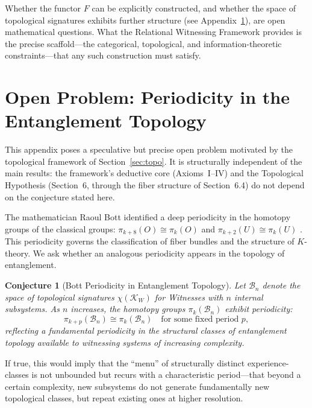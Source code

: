 \documentclass[12pt, a4paper]{article}
\newtheorem{conjecture}{Conjecture}
\begin{document}
Whether the functor $F$ can be explicitly constructed, and whether the space of topological signatures exhibits further structure (see Appendix~\ref{app:bott}), are open mathematical questions. What the Relational Witnessing Framework provides is the precise scaffold---the categorical, topological, and information-theoretic constraints---that any such construction must satisfy.

\appendix
\section{Open Problem: Periodicity in the Entanglement Topology}
\label{app:bott}

This appendix poses a speculative but precise open problem motivated by the topological framework of Section~\ref{sec:topo}. It is structurally independent of the main results: the framework's deductive core (Axioms~I--IV) and the Topological Hypothesis (Section~6, through the fiber structure of Section~6.4) do not depend on the conjecture stated here.

\medskip

The mathematician Raoul Bott identified a deep periodicity in the homotopy groups of the classical groups: $\pi_{k+8}(O) \cong \pi_k(O)$ and $\pi_{k+2}(U) \cong \pi_k(U)$ \cite{Bott1959}. This periodicity governs the classification of fiber bundles and the structure of $K$-theory. We ask whether an analogous periodicity appears in the topology of entanglement.

\begin{conjecture}[Bott Periodicity in Entanglement Topology]
\label{conj:bott}
Let $\mathcal{B}_n$ denote the space of topological signatures $\chi(\mathcal{K}_W)$ for Witnesses with $n$ internal subsystems. As $n$ increases, the homotopy groups $\pi_k(\mathcal{B}_n)$ exhibit periodicity:
\begin{equation}
\pi_{k+p}(\mathcal{B}_n) \cong \pi_k(\mathcal{B}_n) \quad \text{for some fixed period } p,
\label{eq:bottconj}
\end{equation}
reflecting a fundamental periodicity in the structural classes of entanglement topology available to witnessing systems of increasing complexity.
\end{conjecture}

If true, this would imply that the ``menu'' of structurally distinct experience-classes is not unbounded but recurs with a characteristic period---that beyond a certain complexity, new subsystems do not generate fundamentally new topological classes, but repeat existing ones at higher resolution.
\end{document}
